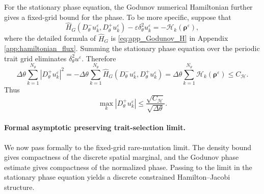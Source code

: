 \documentclass[11pt]{article}
\begin{document}
For the stationary phase equation, the Godunov numerical Hamiltonian further gives a
fixed-grid bound for the phase.  To be more specific, suppose that
\begin{equation}\label{def:Godunov_eq}
    \widehat H_G
    \left(
        D_\theta^-u_k^\varepsilon,
        D_\theta^+u_k^\varepsilon
    \right)
    -
    \varepsilon\delta_\theta^2u_k^\varepsilon
    =
    -\mathcal H_k(\boldsymbol\rho^\varepsilon),
\end{equation}
where the detailed formula of $\widehat H_G$ is \eqref{eq:app_Godunov_H} in Appendix \ref{app:hamiltonian_flux}.  
Summing the stationary phase equation over the periodic trait grid eliminates
\(\delta_\theta^2u^\varepsilon\).  Therefore
\[
    \Delta\theta
    \sum_{k=1}^{N_\theta} |D_\theta^+u_k^\varepsilon|^2
    =
    -\Delta\theta
    \sum_{k=1}^{N_\theta}
    \widehat H_G
    \left(
        D_\theta^-u_k^\varepsilon,
        D_\theta^+u_k^\varepsilon
    \right)
    =
    \Delta\theta
    \sum_{k=1}^{N_\theta}
    \mathcal H_k(\boldsymbol\rho^\varepsilon)
    \le C_{\mathcal H}.
\]
Thus
\begin{equation}\label{proof:bound_Du}
    \max_k |D_\theta^+u_k^\varepsilon|
    \le
    \frac{\sqrt{C_{\mathcal H}}}{\sqrt{\Delta\theta}} .
\end{equation}


\paragraph{Formal asymptotic preserving trait-selection limit.}

We now pass formally to the fixed-grid rare-mutation limit.  The density bound
gives compactness of the discrete spatial marginal, and the Godunov phase
estimate gives compactness of the normalized phase.  Passing to the limit in
the stationary phase equation yields a discrete constrained Hamilton--Jacobi
structure.
\end{document}
